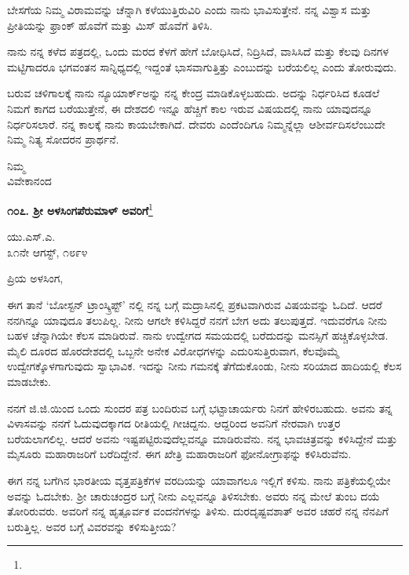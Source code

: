 ಬೇಸಗೆಯ ನಿಮ್ಮ ವಿರಾಮವನ್ನು ಚೆನ್ನಾಗಿ ಕಳೆಯುತ್ತಿರುವಿರಿ ಎಂದು ನಾನು ಭಾವಿಸು\break ತ್ತೇನೆ. ನನ್ನ ವಿಶ್ವಾಸ ಮತ್ತು ಪ್ರೀತಿಯನ್ನು ಫ್ರಾಂಕ್ ಹೊವೆಗೆ ಮತ್ತು ಮಿಸ್ ಹೊವೆಗೆ ತಿಳಿಸಿ.

ನಾನು ನನ್ನ ಕಳೆದ ಪತ್ರದಲ್ಲಿ, ಒಂದು ಮರದ ಕೆಳಗೆ ಹೇಗೆ ಬೋಧಿಸಿದೆ, ನಿದ್ರಿಸಿದೆ, ವಾಸಿಸಿದೆ ಮತ್ತು ಕೆಲವು ದಿನಗಳ ಮಟ್ಟಿಗಾದರೂ ಭಗವಂತನ ಸಾನ್ನಿಧ್ಯದಲ್ಲಿ ಇದ್ದಂತೆ ಭಾಸವಾಗುತ್ತಿತ್ತು ಎಂಬುದನ್ನು ಬರೆಯಲಿಲ್ಲ ಎಂದು ತೋರುವುದು.

ಬರುವ ಚಳಿಗಾಲಕ್ಕೆ ನಾನು ನ್ಯೂಯಾರ್ಕ್‌ಅನ್ನು ನನ್ನ ಕೇಂದ್ರ ಮಾಡಿಕೊಳ್ಳಬಹುದು. ಅದನ್ನು ನಿರ್ಧರಿಸಿದ ಕೂಡಲೆ ನಿಮಗೆ ಕಾಗದ ಬರೆಯುತ್ತೇನೆ, ಈ ದೇಶದಲಿ ಇನ್ನೂ ಹೆಚ್ಚಿಗೆ ಕಾಲ ಇರುವ ವಿಷಯದಲ್ಲಿ ನಾನು ಯಾವುದನ್ನೂ ನಿರ್ಧರಿಸಲಾರೆ. ನನ್ನ ಕಾಲಕ್ಕೆ ನಾನು ಕಾಯಬೇಕಾಗಿದೆ. ದೇವರು ಎಂದೆಂದಿಗೂ ನಿಮ್ಮನ್ನೆಲ್ಲಾ ಆಶೀರ್ವದಿಸಲೆಂಬುದೇ ನಿಮ್ಮ ನಿತ್ಯ ಸೋದರನ ಪ್ರಾರ್ಥನೆ.

{\flushright
ನಿಮ್ಮ\\ವಿವೇಕಾನಂದ\par}

\begin{center}
\textbf{೧೦೭. ಶ‍್ರೀ ಅಳಸಿಂಗಪೆರುಮಾಳ್ ಅವರಿಗೆ}\footnote{}
\end{center}

\begin{flushright}
ಯು.ಎಸ್.ಎ.\\೩೧ನೇ ಆಗಸ್ಟ್, ೧೮೯೪
\end{flushright}

\noindent
ಪ್ರಿಯ ಅಳಸಿಂಗ,

ಈಗ ತಾನೆ ‘ಬೋಸ್ಟನ್ ಟ್ರಾಂಸ್ಕ್ರಿಪ್ಟ್’ ನಲ್ಲಿ ನನ್ನ ಬಗ್ಗೆ ಮದ್ರಾಸಿನಲ್ಲಿ ಪ್ರಕಟವಾಗಿರುವ ವಿಷಯವನ್ನು ಓದಿದೆ. ಆದರೆ ನನಗಿನ್ನೂ ಯಾವುದೂ ತಲುಪಿಲ್ಲ. ನೀನು ಆಗಲೇ ಕಳಿಸಿದ್ದರೆ ನನಗೆ ಬೇಗ ಅದು ತಲುಪುತ್ತದೆ. ಇದುವರೆಗೂ ನೀನು ಬಹಳ ಚೆನ್ನಾಗಿಯೇ ಕೆಲಸ ಮಾಡಿರುವೆ. ನಾನು ಉದ್ವೇಗದ ಸಮಯದಲ್ಲಿ ಬರೆದುದನ್ನು ಮನಸ್ಸಿಗೆ ಹಚ್ಚಿಕೊಳ್ಳಬೇಡ.  ಮೈಲಿ ದೂರದ ಹೊರದೇಶದಲ್ಲಿ ಒಬ್ಬನೇ ಅನೇಕ ವಿರೋಧಗಳನ್ನು ಎದುರಿಸುತ್ತಿರುವಾಗ, ಕೆಲವೊಮ್ಮೆ ಉದ್ವೇಗಕ್ಕೊಳಗಾಗುವುದು ಸ್ವಾಭಾವಿಕ. ಇದನ್ನು ನೀನು ಗಮನಕ್ಕೆ ತೆಗೆದುಕೊಂಡು, ನೀನು ಸರಿಯಾದ ಹಾದಿಯಲ್ಲಿ ಕೆಲಸ ಮಾಡಬೇಕು.

ನನಗೆ ಜಿ.ಜಿ.ಯಿಂದ ಒಂದು ಸುಂದರ ಪತ್ರ ಬಂದಿರುವ ಬಗ್ಗೆ ಭಟ್ಟಾಚಾರ್ಯರು ನಿನಗೆ ಹೇಳಿರಬಹುದು. ಅವನು ತನ್ನ ವಿಳಾಸವನ್ನು ನನಗೆ ಓದುವುದಕ್ಕಾಗದ ರೀತಿಯಲ್ಲಿ ಗೀಚಿದ್ದನು. ಆದ್ದರಿಂದ ಅವನಿಗೆ ನೇರವಾಗಿ ಉತ್ತರ ಬರೆಯಲಾಗಲಿಲ್ಲ. ಆದರೆ ಅವನು ಇಷ್ಟಪಟ್ಟಿರುವುದೆಲ್ಲವನ್ನೂ ಮಾಡಿರುವೆನು. ನನ್ನ ಭಾವಚಿತ್ರವನ್ನು ಕಳಿಸಿದ್ದೇನೆ ಮತ್ತು ಮೈಸೂರು ಮಹಾರಾಜರಿಗೆ ಬರೆದಿದ್ದೇನೆ. ಈಗ ಖೇತ್ರಿ ಮಹಾರಾಜರಿಗೆ ಫೋನೋಗ್ರಾಫನ್ನು ಕಳಿಸಿರುವೆನು.

ಈಗ ನನ್ನ ಬಗೆಗಿನ ಭಾರತೀಯ ವೃತ್ತಪತ್ರಿಕೆಗಳ ವರದಿಯನ್ನು ಯಾವಾಗಲೂ ಇಲ್ಲಿಗೆ ಕಳಿಸು. ನಾನು ಪತ್ರಿಕೆಯಲ್ಲಿಯೇ ಅವನ್ನು ಓದಬೇಕು. ಶ‍್ರೀ ಚಾರುಚಂದ್ರರ ಬಗ್ಗೆ ನೀನು ಎಲ್ಲವನ್ನೂ ತಿಳಿಸಬೇಕು. ಅವರು ನನ್ನ ಮೇಲೆ ತುಂಬ ದಯೆ ತೋರಿರುವರು. ಅವರಿಗೆ ನನ್ನ ಹೃತ್ಪೂರ್ವಕ ವಂದನೆಗಳನ್ನು ತಿಳಿಸು. ದುರದೃಷ್ಟವಶಾತ್ ಅವರ ಚಹರೆ ನನ್ನ ನೆನಪಿಗೆ ಬರುತ್ತಿಲ್ಲ. ಅವರ ಬಗ್ಗೆ ವಿವರವನ್ನು ಕಳಿಸುತ್ತೀಯ?

